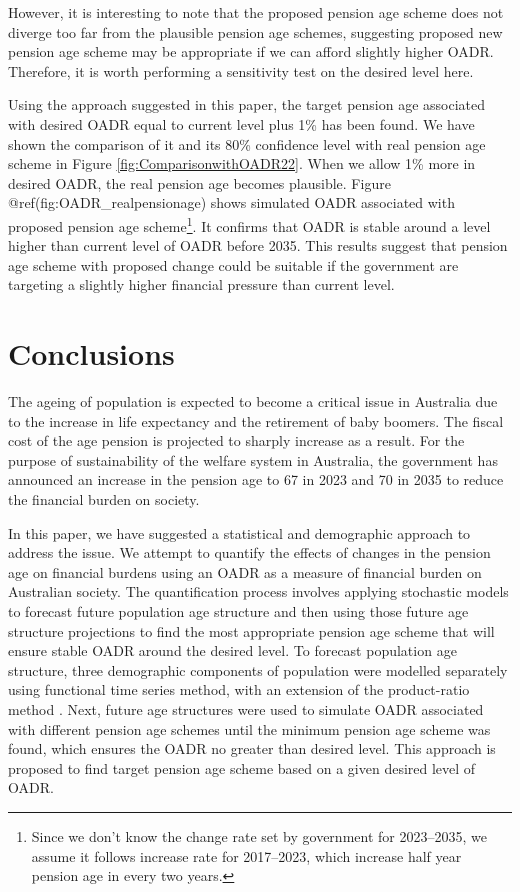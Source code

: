 \documentclass[11pt,a4paper,]{article}
\begin{document}
However, it is interesting to note that the proposed pension age scheme does not diverge too far from the plausible pension age schemes, suggesting proposed new pension age scheme may be appropriate if we can afford slightly higher OADR. Therefore, it is worth performing a sensitivity test on the desired level here.

Using the approach suggested in this paper, the target pension age associated with desired OADR equal to current level plus 1\% has been found. We have shown the comparison of it  and its 80\% confidence level with real pension age scheme in Figure \ref{fig:ComparisonwithOADR22}. When we allow 1\% more in desired OADR, the real pension age becomes plausible. Figure @ref(fig:OADR\_realpensionage) shows simulated OADR associated with proposed pension age scheme\footnote{Since we don't know the change rate set by government for 2023--2035, we assume it follows increase rate for 2017--2023, which increase half year pension age in every two years.}. It confirms that OADR is stable around a level higher than current level of OADR before 2035. This results suggest that pension age scheme with proposed change could be suitable if the government are targeting a slightly higher financial pressure than current level.

\hypertarget{sec:conclusions}{%
\section{Conclusions}\label{sec:conclusions}}

The ageing of population is expected to become a critical issue in Australia due to the increase in life expectancy and the retirement of baby boomers. The fiscal cost of the age pension is projected to sharply increase as a result. For the purpose of sustainability of the welfare system in Australia, the government has announced an increase in the pension age to 67 in 2023 and 70 in 2035 to reduce the financial burden on society.

In this paper, we have suggested a statistical and demographic approach to address the issue. We attempt to quantify the effects of changes in the pension age on financial burdens using an OADR as a measure of financial burden on Australian society. The quantification process involves applying stochastic models to forecast future population age structure and then using those future age structure projections to find the most appropriate pension age scheme that will ensure stable OADR around the desired level. To forecast population age structure, three demographic components of population were modelled separately using \textcite{HU07} functional time series method, with an extension of the product-ratio method \autocite{HBY13}. Next, future age structures were used to simulate OADR associated with different pension age schemes until the minimum pension age scheme was found, which ensures the OADR no greater than desired level. This approach is proposed to find target pension age scheme based on a given desired level of OADR.
\end{document}
